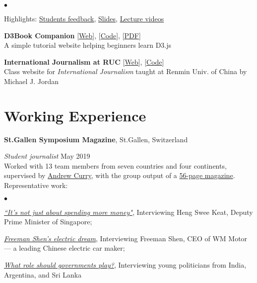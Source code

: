\documentclass[margin,line, 10pt]{res}
\newenvironment{list2}{
  \begin{list}{$\bullet$}{%
      \setlength{\itemsep}{0in}
      \setlength{\parsep}{0in} \setlength{\parskip}{0in}
      \setlength{\topsep}{0in} \setlength{\partopsep}{0in} 
      \setlength{\leftmargin}{0.2in}}}{\end{list}}
\begin{document}
\begin{resume}
\vspace*{.05in}  
\begin{list2}
\item Highlights: \href{https://c101.hongtaoh.com/feedback/}{Students feedback}, \href{https://c101.hongtaoh.com/slides/}{Slides}, \href{https://c101.hongtaoh.com/videos/}{Lecture videos}
\end{list2}

{\bf D3Book Companion}{\hspace{2em} [\href{https://d3book.hongtaoh.com/}{Web}], [\href{https://github.com/hongtaoh/d3book}{Code}]},
[\href{https://d3book.hongtaoh.com/d3book.pdf}{PDF}]\\
A simple tutorial website helping beginners learn D3.js

{\bf International Journalism at RUC}{\hspace{2em} [\href{https://rucer.netlify.app/}{Web}], [\href{https://github.com/hongtaoh/guoxinban}{Code}]} \\
Class website for \textit {International Journalism} taught at Renmin Univ. of China by Michael J. Jordan

\section{\sc Working Experience}
{\bf St.Gallen Symposium Magazine}, St.Gallen, Switzerland

\vspace{-.3cm}
{\em Student journalist} \hfill {May 2019}\\
Worked with 13 team members from seven countries and four continents, supervised by \href{https://www.andrewcurry.com/}{Andrew Curry}, with the group output of a \href{https://www.symposium.org/sites/default/files/2019-11/Magazine\%2049th\%20St.\%20Gallen\%20Symposium.pdf}{56-page magazine}. Representative work:

\begin{list2}
\item {\href{https://www.symposium.org/articles/its-not-just-about-spending-more-money}{\textit{``It's not just about spending more money"}}, Interviewing Heng Swee Keat, Deputy Prime Minister of Singapore;}
\item {\href{https://www.symposium.org/articles/freeman-shens-electric-dream}{\textit{Freeman Shen's electric dream}}, Interviewing Freeman Shen, CEO of WM Motor --- a leading Chinese electric car maker;}
\item {\href{https://www.symposium.org/articles/what-role-should-governments-play}{\textit{What role should governments play?}}, Interviewing young politicians from India, Argentina, and Sri Lanka}
\end{list2}


\end{resume}
\end{document}
